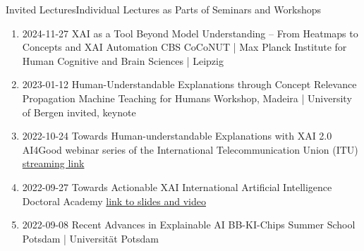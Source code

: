 \headedsubsection
{Invited Lectures}{Individual Lectures as Parts of Seminars and Workshops}
{
\begin{enumerate}
    \item {}
                    {2024-11-27}
                    {XAI as a Tool Beyond Model Understanding -- From Heatmaps to Concepts and XAI Automation}
                    {CBS CoCoNUT | Max Planck Institute for Human Cognitive and Brain Sciences | Leipzig}
    \item {}
                    {2023-01-12}
                    {Human-Understandable Explanations through Concept Relevance Propagation}
                    {Machine Teaching for Humans Workshop, Madeira | University of Bergen}
                    {invited, keynote}
    \item {}
                    {2022-10-24}
                    {Towards Human-understandable Explanations with XAI 2.0}
                    {AI4Good webinar series of the International Telecommunication Union (ITU)}
                    {\href{https://www.youtube.com/watch?v=NiE13aBBx28}{streaming link}}
    \item {}
                    {2022-09-27}
                    {Towards Actionable XAI}
                    {International Artificial Intelligence Doctoral Academy}
                    {\href{https://www.i-aida.org/events/towards-actionable-xai-2/}{link to slides and video}}
    \item {}
                    {2022-09-08}
                    {Recent Advances in Explainable AI}
                    {BB-KI-Chips Summer School Potsdam | Universität Potsdam}

\end{enumerate}}
